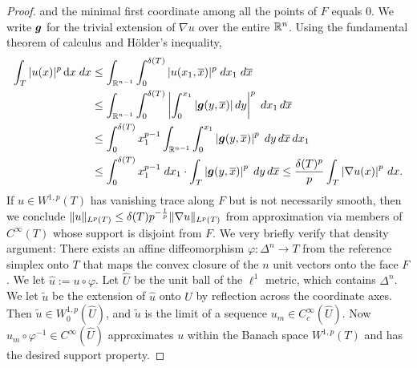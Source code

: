 \documentclass[10pt,a4paper]{article}
\begin{document}
\begin{proof}
    and the minimal first coordinate among all the points of $F$ equals $0$. 
    We write $\bm{g}$ for the trivial extension of $\nabla u$ over the entire ${\mathbb R}^{n}$.
    Using the fundamental theorem of calculus and H\"older's inequality, 
    \begin{align*}
        \int_{T} |u(x)|^{p} \mathop{}\!\mathrm{d} x \;dx
        &\leq
        \int_{{\mathbb R}^{n-1}} \int_{0}^{{\delta}(T)} |u( x_{1}, \overline x )|^{p} \;dx_{1} \;d\overline{x}
        \\&
        \leq
        \int_{{\mathbb R}^{n-1}} \int_{0}^{{\delta}(T)} \left| \int_{0}^{x_{1}} |\bm{g}( y, \overline x )| \,dy \right|^{p} \;dx_{1} \,d\overline{x}
        \\&
        \leq
        \int_{0}^{{\delta}(T)} x_{1}^{p-1} \int_{{\mathbb R}^{n-1}} \int_{0}^{x_{1}} \left| \bm{g}( y, \overline x ) \right|^{p} \;dy \,d\overline{x} \,dx_{1}
        \\&
        \leq
        \int_{0}^{{\delta}(T)} x_{1}^{p-1} \;dx_1 
        \cdot 
        \int_{T} \left| \bm{g}( y, \overline x ) \right|^{p} \;dy \,d\overline{x} 
        \leq
        \frac{{\delta}(T)^{p}}{p} \int_{T} \left| \nabla u( x ) \right|^{p} \,dx
        .
    \end{align*}
    If $u \in W^{1,p}(T)$ has vanishing trace along $F$ but is not necessarily smooth, 
    then we conclude $\|u\|_{L^{p}(T)} \leq {\delta}(T) p^{-\frac 1 p} \|\nabla u\|_{L^{p}(T)}$ 
    from approximation via members of $C^{\infty}(T)$ whose support is disjoint from $F$. 
    We very briefly verify that density argument: 
    There exists an affine diffeomorphism $\varphi : \Delta^{n} \rightarrow T$ from the reference simplex onto $T$ that maps the convex closure of the $n$ unit vectors onto the face $F$.
    We let $\hat u := u \circ \varphi$.
    Let $\hat U$ be the unit ball of the $\ell^1$ metric, which contains $\Delta^{n}$.
    We let $\tilde u$ be the extension of $\hat u$ onto $\hat U$ by reflection across the coordinate axes.
    Then $\tilde u \in W^{1,p}_{0}(\hat U)$, and $\tilde u$ is the limit of a sequence $u_{m} \in C^{\infty}_{c}(\hat U)$.
    Now $u_{m} \circ \varphi^{-1} \in C^{\infty}(\hat U)$ approximates $u$ within the Banach space $W^{1,p}(T)$
    and has the desired support property. 
\end{proof}
\end{document}
